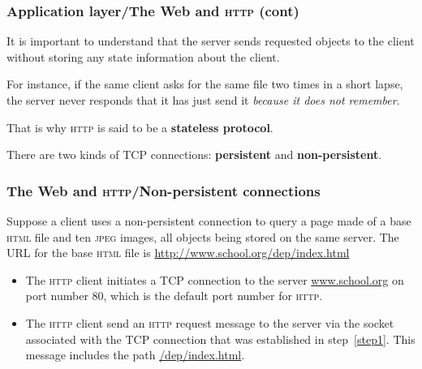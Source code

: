%
\begin{frame}
\frametitle{Application layer/The Web and \textsc{http} (cont)}

It is important to understand that the server sends requested objects
to the client without storing any state information about the client.

\bigskip

For instance, if the same client asks for the same file two times in a
short lapse, the server never responds that it has just send it
\emph{because it does not remember}.

\bigskip

That is why \textsc{http} is said to be a \textbf{stateless
protocol}.

\bigskip

There are two kinds of TCP connections: \textbf{persistent} and
\textbf{non-persistent}. 

\end{frame}

%
\begin{frame}
\frametitle{The Web and \textsc{http}/Non-persistent connections} 

Suppose a client uses a non-persistent connection to query a page made
of a base \textsc{html} file and ten \textsc{jpeg} images, all objects
being stored on the same server. The URL for the base \textsc{html}
file is \url{http://www.school.org/dep/index.html}
\begin{itemize}

  \item The \textsc{http} client initiates a TCP
    connection to the server \url{www.school.org} on port number 80,
    which is the default port number for \textsc{http}.\label{step1} 

  \item The \textsc{http} client send an \textsc{http} request message
    to the server via the socket associated with the TCP connection
    that was established in step~\ref{step1}. This message includes
    the path \url{/dep/index.html}.

\end{itemize}

\end{frame}


